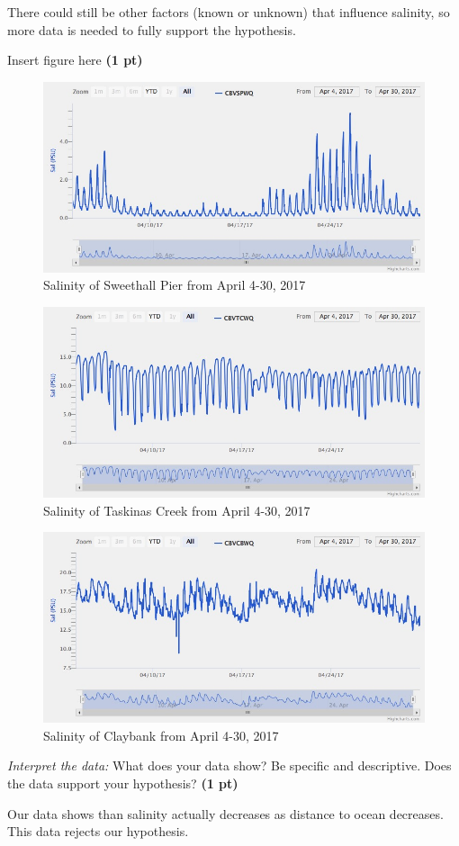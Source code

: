 \documentclass[12pt,letterpaper]{article}
\begin{document}
\begin{enumerate}[font=\bfseries, wide, resume]
    There could still be other factors (known or unknown) that influence salinity, so more data is needed to fully support the hypothesis. 
    \newpage
    {\color{under}\item Insert figure here \textbf{(1 pt)}}
        \begin{figure}[h]
            \centering
            \includegraphics[width=0.5\linewidth]{images/Sweethall.jpeg}
            \caption{Salinity of Sweethall Pier from April 4-30, 2017}
        \end{figure}
        \begin{figure}[h]
            \centering
            \includegraphics[width=0.5\linewidth]{images/Taskinas Creek.jpeg}
            \caption{Salinity of Taskinas Creek from April 4-30, 2017}
        \end{figure}
        \begin{figure}[h]
            \centering
            \includegraphics[width=0.5\linewidth]{images/Claybank.jpeg}
            \caption{Salinity of Claybank from April 4-30, 2017}
        \end{figure}
    {\color{under}\item \textit{Interpret the data:} What does your data show? Be specific and descriptive. Does the data support your hypothesis? \textbf{(1 pt)}}

    Our data shows than salinity actually decreases as distance to ocean decreases. This data rejects our hypothesis.


\end{enumerate}
\end{document}
